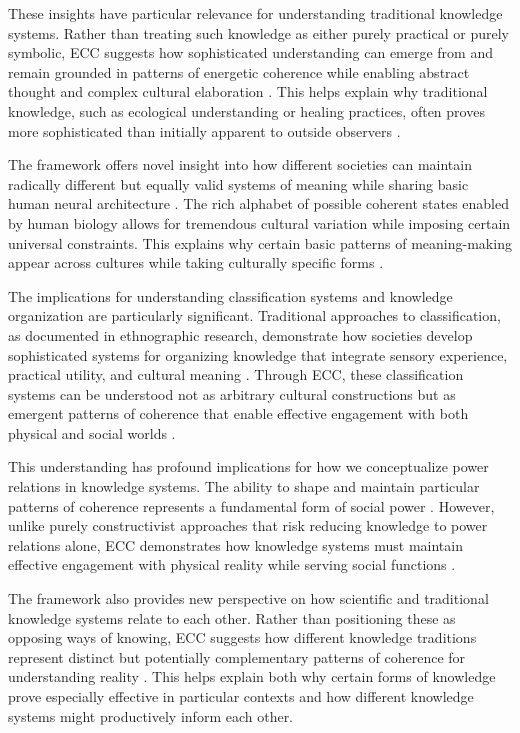 These insights have particular relevance for understanding traditional knowledge systems. Rather than treating such knowledge as either purely practical or purely symbolic, ECC suggests how sophisticated understanding can emerge from and remain grounded in patterns of energetic coherence while enabling abstract thought and complex cultural elaboration \cite{varela1991embodied}. This helps explain why traditional knowledge, such as ecological understanding or healing practices, often proves more sophisticated than initially apparent to outside observers \cite{jackson1996things}.

The framework offers novel insight into how different societies can maintain radically different but equally valid systems of meaning while sharing basic human neural architecture \cite{merleau1962phenomenology}. The rich alphabet of possible coherent states enabled by human biology allows for tremendous cultural variation while imposing certain universal constraints. This explains why certain basic patterns of meaning-making appear across cultures while taking culturally specific forms \cite{throop2003articulating}.

The implications for understanding classification systems and knowledge organization are particularly significant. Traditional approaches to classification, as documented in ethnographic research, demonstrate how societies develop sophisticated systems for organizing knowledge that integrate sensory experience, practical utility, and cultural meaning \cite{ellen2016cultural}. Through ECC, these classification systems can be understood not as arbitrary cultural constructions but as emergent patterns of coherence that enable effective engagement with both physical and social worlds \cite{levi1966savage}.

This understanding has profound implications for how we conceptualize power relations in knowledge systems. The ability to shape and maintain particular patterns of coherence represents a fundamental form of social power \cite{foucault1980power}. However, unlike purely constructivist approaches that risk reducing knowledge to power relations alone, ECC demonstrates how knowledge systems must maintain effective engagement with physical reality while serving social functions \cite{scott1998seeing}.

The framework also provides new perspective on how scientific and traditional knowledge systems relate to each other. Rather than positioning these as opposing ways of knowing, ECC suggests how different knowledge traditions represent distinct but potentially complementary patterns of coherence for understanding reality \cite{latour1999pandora}. This helps explain both why certain forms of knowledge prove especially effective in particular contexts and how different knowledge systems might productively inform each other.

